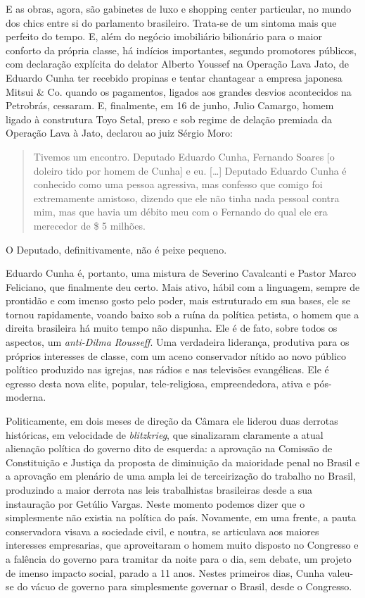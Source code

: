 E as obras, agora, são gabinetes de luxo e shopping center particular,
no mundo dos chics entre si do parlamento brasileiro. Trata-se de um
sintoma mais que perfeito do tempo. E, além do negócio imobiliário
bilionário para o maior conforto da própria classe, há indícios
importantes, segundo promotores públicos, com declaração explícita do
delator Alberto Youssef na Operação Lava Jato, de Eduardo Cunha ter
recebido propinas e tentar chantagear a empresa japonesa Mitsui \& Co.
quando os pagamentos, ligados aos grandes desvios acontecidos na
Petrobrás, cessaram. E, finalmente, em 16 de junho, Julio Camargo, homem
ligado à construtura Toyo Setal, preso e sob regime de delação premiada
da Operação Lava à Jato, declarou ao juiz Sérgio Moro:

\begin{quote}
Tivemos um encontro. Deputado Eduardo Cunha, Fernando Soares {[}o
doleiro tido por homem de Cunha{]} e eu. {[}…{]} Deputado Eduardo
Cunha é conhecido como uma pessoa agressiva, mas confesso que comigo foi
extremamente amistoso, dizendo que ele não tinha nada pessoal contra
mim, mas que havia um débito meu com o Fernando do qual ele era
merecedor de \$ 5 milhões.~
\end{quote}

O Deputado, definitivamente, não é peixe pequeno.

Eduardo Cunha é, portanto, uma mistura de Severino Cavalcanti e Pastor
Marco Feliciano, que finalmente deu certo. Mais ativo, hábil com a
linguagem, sempre de prontidão e com imenso gosto pelo poder, mais
estruturado em sua bases, ele se tornou rapidamente, voando baixo sob a
ruína da política petista, o homem que a direita brasileira há muito
tempo não dispunha. Ele é de fato, sobre todos os aspectos, um
\emph{anti-Dilma Rousseff}. Uma verdadeira liderança, produtiva para os
próprios interesses de classe, com um aceno conservador nítido ao novo
público político produzido nas igrejas, nas rádios e nas televisões
evangélicas. Ele é egresso desta nova elite, popular, tele-religiosa,
empreendedora, ativa e pós-moderna.

Politicamente, em dois meses de direção da Câmara ele liderou duas
derrotas históricas, em velocidade de \emph{blitzkrieg}, que sinalizaram
claramente a atual alienação política do governo dito de esquerda: a
aprovação na Comissão de Constituição e Justiça da proposta de
diminuição da maioridade penal no Brasil e a aprovação em plenário de
uma ampla lei de terceirização do trabalho no Brasil, produzindo a maior
derrota nas leis trabalhistas brasileiras desde a sua instauração por
Getúlio Vargas. Neste momento podemos dizer que o  simplesmente não
existia na política do país. Novamente, em uma frente, a pauta
conservadora visava a sociedade civil, e noutra, se articulava aos
maiores interesses empresarias, que aproveitaram o homem muito disposto
no Congresso e a falência do governo para tramitar da noite para o dia,
sem debate, um projeto de imenso impacto social, parado a 11 anos.
Nestes primeiros dias, Cunha valeu-se do vácuo de governo para
simplesmente governar o Brasil, desde o Congresso.

